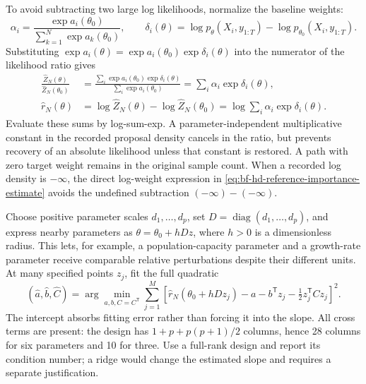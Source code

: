 To avoid subtracting two large log likelihoods, normalize the baseline weights:
\begin{equation}
  \alpha_i=
  \frac{\exp a_i(\theta_0)}{\sum_{k=1}^N\exp a_k(\theta_0)},
  \qquad
  \delta_i(\theta)=
  \log p_\theta(X_i,y_{1:T})-\log p_{\theta_0}(X_i,y_{1:T}).
  \label{eq:bf-hd-reference-baseline-weights}
\end{equation}
Substituting $\exp a_i(\theta)=\exp a_i(\theta_0)\exp\delta_i(\theta)$
into the numerator of the likelihood ratio gives
\begin{align}
  \frac{\widehat Z_N(\theta)}{\widehat Z_N(\theta_0)}
   &=\frac{\sum_i\exp a_i(\theta_0)\exp\delta_i(\theta)}
           {\sum_i\exp a_i(\theta_0)}
     =\sum_i\alpha_i\exp\delta_i(\theta),\\
  \widehat r_N(\theta)
   &=\log\widehat Z_N(\theta)-\log\widehat Z_N(\theta_0)
     =\log\sum_i\alpha_i\exp\delta_i(\theta).
  \label{eq:bf-hd-reference-log-ratio}
\end{align}
Evaluate these sums by log-sum-exp.  A parameter-independent multiplicative
constant in the recorded proposal density cancels in the ratio, but prevents
recovery of an absolute likelihood unless that constant is restored.  A path
with zero target weight remains in the original sample count.  When a recorded
log density is $-\infty$, the direct log-weight expression in
\eqref{eq:bf-hd-reference-importance-estimate} avoids the undefined subtraction
$(-\infty)-(-\infty)$.

Choose positive parameter scales $d_1,\ldots,d_p$, set
$D=\operatorname{diag}(d_1,\ldots,d_p)$, and express nearby parameters as
$\theta=\theta_0+hDz$, where $h>0$ is a dimensionless radius.  This lets, for
example, a population-capacity parameter and a growth-rate parameter receive
comparable relative perturbations despite their different units.  At many
specified points $z_j$, fit the full quadratic
\begin{equation}
  (\widehat a,\widehat b,\widehat C)
  =\arg\min_{a,b,C=C^\mathsf T}
  \sum_{j=1}^M\left[
       \widehat r_N(\theta_0+hDz_j)
       -a-b^\mathsf Tz_j-\tfrac12z_j^\mathsf TCz_j
       \right]^2.
  \label{eq:bf-hd-reference-quadratic-fit}
\end{equation}
The intercept absorbs fitting error rather than forcing it into the slope.
All cross terms are present: the design has
$1+p+p(p+1)/2$ columns, hence 28 columns for six parameters and 10 for three.
Use a full-rank design and report its condition number; a ridge would change the
estimated slope and requires a separate justification.

